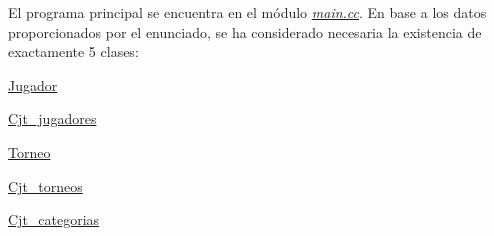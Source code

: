 El programa principal se encuentra en el módulo {\itshape \mbox{\hyperlink{main_8cc}{main.\+cc}}}. En base a los datos proporcionados por el enunciado, se ha considerado necesaria la existencia de exactamente 5 clases\+: 
\begin{DoxyItemize}
\item \mbox{\hyperlink{class_jugador}{Jugador}} 
\item \mbox{\hyperlink{class_cjt__jugadores}{Cjt\+\_\+jugadores}} 
\item \mbox{\hyperlink{class_torneo}{Torneo}} 
\item \mbox{\hyperlink{class_cjt__torneos}{Cjt\+\_\+torneos}} 
\item \mbox{\hyperlink{class_cjt__categorias}{Cjt\+\_\+categorias}} 
\end{DoxyItemize}
